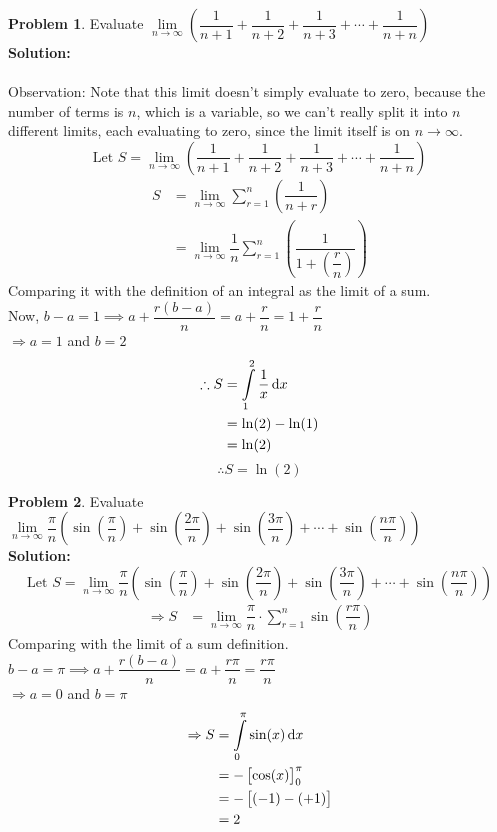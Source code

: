 \documentclass[14]{article}
\theoremstyle{definition}
\newtheorem{prob}{Problem}
\theoremstyle{case}
\begin{document}
\begin{prob}
Evaluate $\lim\limits_{n \to \infty} \left(\dfrac1{n+1} + \dfrac1{n+2} + \dfrac1{n+3} + \cdots + \dfrac1{n + n} \right)$\\
\textbf{Solution:}\\\\
Observation: Note that this limit doesn't simply evaluate to zero, because the number of terms is $n$, which is a variable, so we can't really split it into $n$ different limits, each evaluating to zero, since the limit itself is on $n \to \infty$.
\[\text{Let } S = \lim\limits_{n \to \infty} \left(\dfrac1{n+1} + \dfrac1{n+2} + \dfrac1{n+3} + \cdots + \dfrac1{n + n} \right)\]
\begin{align*}
S &= \lim\limits_{n \to \infty} \sum\limits_{r = 1}^n \left(\dfrac1{n+r}\right)\\
&= \lim\limits_{n \to \infty} \dfrac1n \sum\limits_{r=1}^n  \left( \dfrac1{1 + \left( \dfrac{r}{n} \right)}\right)
\end{align*}
Comparing it with the definition of an integral as the limit of a sum.\\
Now, $b - a = 1 \implies a + \dfrac{r(b-a)}{n} = a + \dfrac{r}{n} = 1 + \dfrac{r}{n}$\\
$\Rightarrow a = 1$ and $b = 2$\\
\begin{align*}
\therefore S &= \int\limits_1^2 \dfrac1x \dif x\\ 
&= \ln(2) - \ln(1)\\ 
&= \ln(2)
\end{align*}
\[\therefore S = \ln(2)\]
\end{prob}
\pagebreak
\begin{prob}
Evaluate $\lim\limits_{n \to \infty} \dfrac{\pi}{n} \left( \sin\left( \dfrac{\pi}{n} \right) + \sin\left( \dfrac{2\pi}{n} \right) + \sin\left( \dfrac{3\pi}{n} \right) + \cdots + \sin\left( \dfrac{n\pi}{n} \right) \right)$\\
\textbf{Solution:}\\
\[\text{Let } S = \lim\limits_{n \to \infty} \dfrac{\pi}{n} \left( \sin\left( \dfrac{\pi}{n} \right) + \sin\left( \dfrac{2\pi}{n} \right) + \sin\left( \dfrac{3\pi}{n} \right) + \cdots + \sin\left( \dfrac{n\pi}{n} \right) \right)\]
\begin{align*}
\Rightarrow S &= \lim\limits_{n \to \infty} \dfrac{\pi}{n} \cdot \sum\limits_{r = 1}^{n} \sin\left( \dfrac{r \pi}{n} \right)
\end{align*}
Comparing with the limit of a sum definition.\\
$b - a = \pi \implies a + \dfrac{r(b-a)}{n} = a + \dfrac{r\pi}{n} = \dfrac{r\pi}{n}$\\
$\Rightarrow a = 0$ and $b = \pi$
\begin{align*}
\Rightarrow S &= \int\limits_0^{\pi} \sin(x) \dif x\\
&= -\left[\cos(x)\right]_0^{\pi}\\
&= - \left[ (-1) - (+1) \right]\\
&= 2
\end{align*}
\end{prob}
\end{document}
